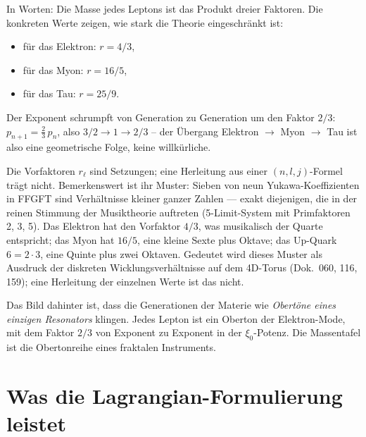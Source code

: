 \medskip\noindent

In Worten: Die Masse jedes Leptons ist das Produkt dreier Faktoren.
Die konkreten Werte zeigen, wie stark die Theorie eingeschränkt ist:
\begin{itemize}
  \item für das Elektron: $r = 4/3$,
  \item für das Myon: $r = 16/5$,
  \item für das Tau: $r = 25/9$.
\end{itemize}
Der Exponent schrumpft von Generation zu Generation um den Faktor
$2/3$: $p_{n+1} = \tfrac{2}{3}\,p_n$, also $3/2 \to 1 \to 2/3$ -- der Übergang Elektron $\to$ Myon $\to$ Tau ist
also eine geometrische Folge, keine willkürliche.

Die Vorfaktoren $r_\ell$ sind Setzungen; eine Herleitung aus einer
$(n,l,j)$-Formel trägt nicht. Bemerkenswert ist ihr Muster:
Sieben von neun Yukawa-Koeffizienten in FFGFT sind Verhältnisse
kleiner ganzer Zahlen --- exakt diejenigen, die in der reinen
Stimmung der Musiktheorie auftreten (5-Limit-System mit Primfaktoren
2, 3, 5). Das Elektron hat den Vorfaktor $4/3$, was musikalisch der
Quarte entspricht; das Myon hat $16/5$, eine kleine Sexte plus
Oktave; das Up-Quark $6 = 2 \cdot 3$, eine Quinte plus zwei Oktaven.
Gedeutet wird dieses Muster als Ausdruck der diskreten
Wicklungsverhältnisse auf dem 4D-Torus (Dok.~060, 116, 159); eine
Herleitung der einzelnen Werte ist das nicht.

Das Bild dahinter ist, dass die Generationen der Materie wie
\emph{Obertöne eines einzigen Resonators} klingen. Jedes Lepton ist
ein Oberton der Elektron-Mode, mit dem Faktor $2/3$ von Exponent zu Exponent in
der $\xi_0$-Potenz. Die Massentafel ist die Obertonreihe eines
fraktalen Instruments.

\section{Was die Lagrangian-Formulierung leistet}

